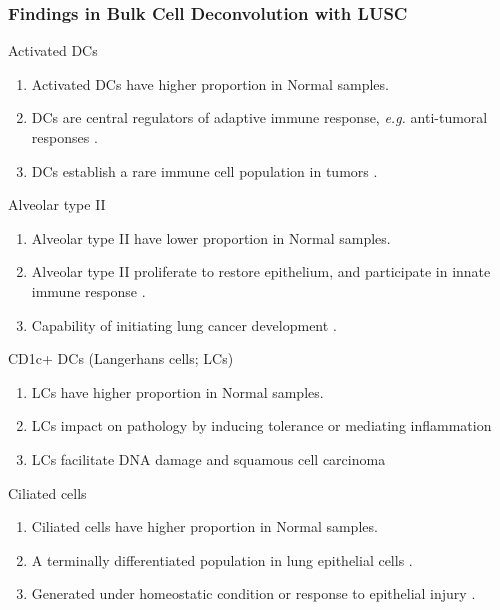 \documentclass{beamer}
\begin{document}
    \begin{frame}[allowframebreaks]
        \frametitle{Findings in Bulk Cell Deconvolution with LUSC}

        \begin{block}{Activated DCs}
            \begin{enumerate}
                \item Activated DCs have higher proportion in Normal samples.
                \item DCs are central regulators of adaptive immune response, \textit{e.g.} anti-tumoral responses .
                \item DCs establish a rare immune cell population in tumors .
            \end{enumerate}
        \end{block}

        \begin{block}{Alveolar type II}
            \begin{enumerate}
                \item Alveolar type II have lower proportion in Normal samples.
                \item Alveolar type II proliferate to restore epithelium, and participate in innate immune response \cite{ATII-1}.
                \item Capability of initiating lung cancer development \cite{ATII-2}.
            \end{enumerate}
        \end{block}

        \begin{block}{CD1c+ DCs (Langerhans cells; LCs)}
            \begin{enumerate}
                \item LCs have higher proportion in Normal samples.
                \item LCs impact on pathology by inducing tolerance or mediating inflammation \cite{LCs-1}
                \item LCs facilitate DNA damage and squamous cell carcinoma \cite{LCs-2}
            \end{enumerate}
        \end{block}

        \begin{block}{Ciliated cells}
            \begin{enumerate}
                \item Ciliated cells have higher proportion in Normal samples.
                \item A terminally differentiated population in lung epithelial cells \cite{ciliated-1}.
                \item Generated under homeostatic condition or response to epithelial injury \cite{ciliated-2}.
            \end{enumerate}
        \end{block}


\end{frame}
\end{document}
